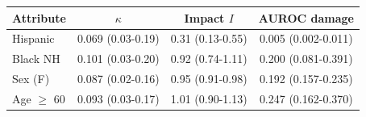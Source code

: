 \begin{tabular}{lccc}
\toprule
Attribute & $\kappa$ & Impact $I$ & AUROC damage \\
\midrule
Hispanic & 0.069 (0.03-0.19) & 0.31 (0.13-0.55) & 0.005 (0.002-0.011) \\
Black NH & 0.101 (0.03-0.20) & 0.92 (0.74-1.11) & 0.200 (0.081-0.391) \\
Sex (F) & 0.087 (0.02-0.16) & 0.95 (0.91-0.98) & 0.192 (0.157-0.235) \\
Age $\geq$ 60 & 0.093 (0.03-0.17) & 1.01 (0.90-1.13) & 0.247 (0.162-0.370) \\
\bottomrule
\end{tabular}
